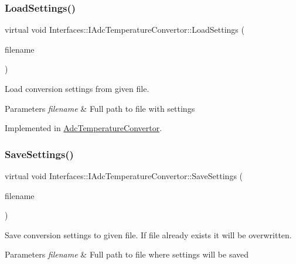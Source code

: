 \subsubsection{\texorpdfstring{Load\+Settings()}{LoadSettings()}}
{\footnotesize\ttfamily virtual void Interfaces\+::\+I\+Adc\+Temperature\+Convertor\+::\+Load\+Settings (\begin{DoxyParamCaption}\item[{Q\+String}]{filename }\end{DoxyParamCaption})\hspace{0.3cm}{\ttfamily [pure virtual]}}



Load conversion settings from given file. 


\begin{DoxyParams}{Parameters}
{\em filename} & Full path to file with settings \\
\hline
\end{DoxyParams}


Implemented in \hyperlink{class_adc_temperature_convertor_affab0a66a3508e2eedd8bab3407ae80f}{Adc\+Temperature\+Convertor}.

\mbox{\label{class_interfaces_1_1_i_adc_temperature_convertor_a6631e979e067ab78d3e5c337449876ac}} 
\subsubsection{\texorpdfstring{Save\+Settings()}{SaveSettings()}}
{\footnotesize\ttfamily virtual void Interfaces\+::\+I\+Adc\+Temperature\+Convertor\+::\+Save\+Settings (\begin{DoxyParamCaption}\item[{Q\+String}]{filename }\end{DoxyParamCaption})\hspace{0.3cm}{\ttfamily [pure virtual]}}



Save conversion settings to given file. If file already exists it will be overwritten. 


\begin{DoxyParams}{Parameters}
{\em filename} & Full path to file where settings will be saved \\
\hline
\end{DoxyParams}


